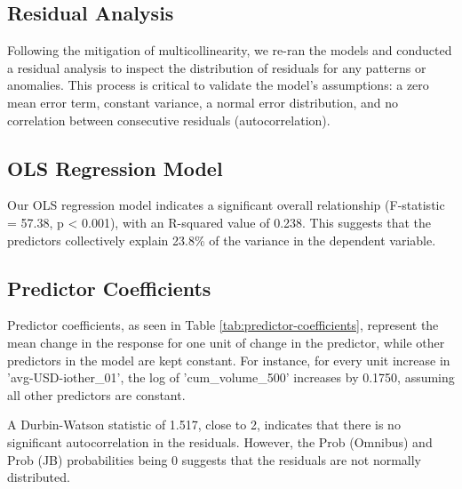 \documentclass{article}
\begin{document}
\subsection{Residual Analysis}
Following the mitigation of multicollinearity, we re-ran the models and conducted a residual analysis to inspect the distribution of residuals for any patterns or anomalies. This process is critical to validate the model's assumptions: a zero mean error term, constant variance, a normal error distribution, and no correlation between consecutive residuals (autocorrelation).

\subsection{OLS Regression Model}
Our OLS regression model indicates a significant overall relationship (F-statistic = 57.38, p \textless{} 0.001), with an R-squared value of 0.238. This suggests that the predictors collectively explain 23.8\% of the variance in the dependent variable.

\subsection{Predictor Coefficients}
Predictor coefficients, as seen in Table \ref{tab:predictor-coefficients}, represent the mean change in the response for one unit of change in the predictor, while other predictors in the model are kept constant. For instance, for every unit increase in 'avg-USD-iother\_01', the log of 'cum\_volume\_500' increases by 0.1750, assuming all other predictors are constant.

A Durbin-Watson statistic of 1.517, close to 2, indicates that there is no significant autocorrelation in the residuals. However, the Prob (Omnibus) and Prob (JB) probabilities being 0 suggests that the residuals are not normally distributed.
\end{document}
